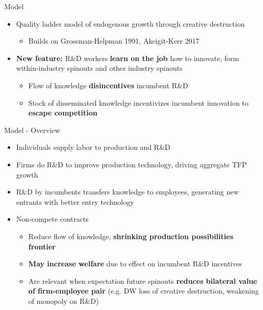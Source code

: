 \documentclass[english,usenames,dvipsnames]{beamer}
\begin{document}
\begin{frame}
\tableofcontents[currentsection]
\end{frame}

\begin{frame}{Model}
\begin{itemize}	
\item Quality ladder model of endogenous growth through creative destruction 
\begin{itemize}
	\item Builds on Grossman-Helpman 1991, Akcigit-Kerr 2017 
\end{itemize}
\item \textbf{New feature:} R\&D workers \textbf{\alert{learn on the job}} how to innovate, form within-industry spinouts and other industry spinouts
\begin{itemize}
	\item Flow of knowledge \textbf{\alert{disincentives}} incumbent R\&D
	\item Stock of disseminated knowledge incentivizes incumbent innovation to \textbf{\alert{escape competition}}
\end{itemize} 
\end{itemize}
\end{frame}

\begin{frame}{Model - Overview}
\begin{itemize}
\item Individuals supply labor to production and R\&D
\item Firms do R\&D to improve production technology, driving aggregate TFP growth
\item R\&D by incumbents transfers knowledge to employees, generating new entrants with better entry technology
\item Non-compete contracts
\begin{itemize}
\item Reduce flow of knowledge, \textbf{\alert{shrinking production possibilities frontier}}
\item \textbf{\alert{May increase welfare}} due to effect on incumbent R\&D incentives
\item Are relevant when expectation future spinouts \textbf{\alert{reduces bilateral value of firm-employee pair}} (e.g. DW loss of creative destruction, weakening of monopoly on R\&D)
\end{itemize}
\end{itemize}
\end{frame}
\end{document}
